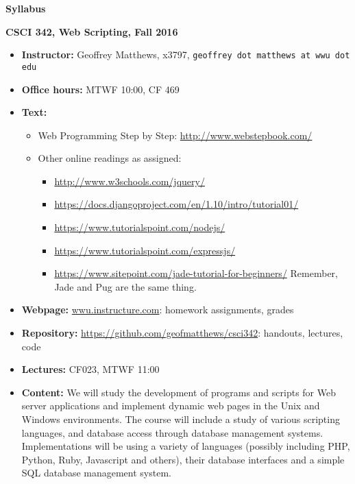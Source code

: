 \documentclass{article}
\begin{document}
\centerline{\large \bf Syllabus}

\centerline{\bf CSCI 342, Web Scripting, Fall 2016}

\begin{itemize}

\item
{\bf Instructor:} Geoffrey Matthews, x3797, {\tt  geoffrey dot matthews at wwu dot edu}
\item
{\bf Office hours:} MTWF 10:00, CF 469
\item
{\bf Text:} \begin{itemize}\item
Web Programming Step by Step: \url{http://www.webstepbook.com/}
\item
  Other online readings as assigned:
  \begin{itemize}
  \item \url{http://www.w3schools.com/jquery/}
  \item \url{https://docs.djangoproject.com/en/1.10/intro/tutorial01/}
  \item \url{https://www.tutorialspoint.com/nodejs/}
  \item \url{https://www.tutorialspoint.com/expressjs/}
  \item \url{https://www.sitepoint.com/jade-tutorial-for-beginners/}
    Remember, Jade and Pug are the same thing.
  \end{itemize}
\end{itemize}
\item {\bf Webpage:}  \url{wwu.instructure.com}:  homework assignments, grades
\item {\bf Repository:} \url{https://github.com/geofmatthews/csci342}:  handouts, lectures, code
\item
{\bf Lectures:} 
CF023, MTWF 11:00

\item
{\bf Content:} We will study the development of programs and scripts
for Web server applications and implement dynamic web pages in the
Unix and Windows environments.  The course will include a study of
various scripting languages, and database access through database
management systems.  Implementations will be using a variety of
languages (possibly including PHP, Python, Ruby, Javascript and
others), their database interfaces and a simple SQL database
management system.


\end{itemize}
\end{document}
